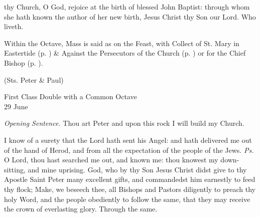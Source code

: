 \postcommunion
\label{JohnPC}
 thy Church, O God, rejoice at the birth of blessed John Baptist: through whom she hath known the author of her new birth, Jesus Christ thy Son our Lord. Who liveth.
\begin{rubric}
    Within the Octave, Mass is said as on the Feast, with  Collect of St. Mary in Eastertide (p. \pageref{SPMaryInEaster}) \&  Against the Persecutors of the Church (p. \pageref{SPAgainst}) or for the Chief Bishop (p. \pageref{SPChiefBishop}).
\end{rubric}



\centerline{(Sts. Peter \& Paul)}

\begin{inhead}
    {First Class Double with a Common Octave\\
29 June}
\end{inhead}
\par\noindent
\textit{Opening Sentence.} Thou art Peter and upon this rock I will build my Church.%



\introit
{} I know of a surety that the Lord hath sent his Angel: and hath delivered me out of the hand of Herod, and from all the expectation of the people of the Jews. \textit{Ps.} O Lord, thou hast searched me out, and known me: thou knowest my down-sitting, and mine uprising.
\collect
{} God, who by thy Son Jesus Christ didst give to thy Apostle Saint Peter many excellent gifts, and commandedst him earnestly to feed thy flock; Make, we beseech thee, all Bishops and Pastors diligently to preach thy holy Word, and the people obediently to follow the same, that they may receive the crown of everlasting glory. Through the same.

